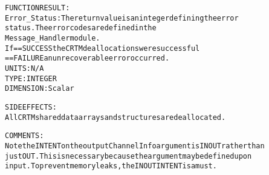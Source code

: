 \begin{alltt}
  FUNCTION RESULT:
        Error_Status: The return value is an integer defining the error
                      status. The error codes are defined in the
                      Message_Handler module.
                      If == SUCCESS the CRTM deallocations were successful
                         == FAILURE an unrecoverable error occurred.
                      UNITS:      N/A
                      TYPE:       INTEGER
                      DIMENSION:  Scalar
 
  SIDE EFFECTS:
        All CRTM shared data arrays and structures are deallocated.
 
  COMMENTS:
        Note the INTENT on the output ChannelInfo argument is IN OUT rather than
        just OUT. This is necessary because the argument may be defined upon
        input. To prevent memory leaks, the IN OUT INTENT is a must.
 
  \end{alltt}
